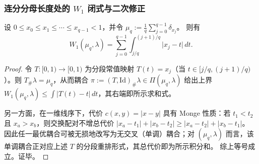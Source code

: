 \subsubsection{连分分母长度处的 \texorpdfstring{$W_1$}{W1} 闭式与二次修正}\label{subsec:kronecker-w1-denominator}

\begin{lemma}[一维单调耦合的分位公式]\label{lem:w1-quantile-formula-empirical-uniform}
设 \(0\le x_0\le x_1\le\cdots\le x_{q-1}<1\)，并令
\(
\mu_q:=\frac1q\sum_{j=0}^{q-1}\delta_{x_j}
\)。
则有
\[
W_1(\mu_q,\lambda)=\sum_{j=0}^{q-1}\int_{j/q}^{(j+1)/q}\bigl|x_j-t\bigr|\,dt.
\]
\end{lemma}
\begin{proof}
令 \(T:[0,1)\to[0,1)\) 为分段常值映射 \(T(t)=x_j\)（当 \(t\in[j/q,(j+1)/q)\)）。则 \(T_\#\lambda=\mu_q\)，从而耦合 \(\pi:=(T,\mathrm{Id})_\#\lambda\in\Pi(\mu_q,\lambda)\) 给出上界
\(
W_1(\mu_q,\lambda)\le \int|T(t)-t|\,dt
\)，其右端即所示求和式。
\par
另一方面，在一维线序下，代价 \(c(x,y)=|x-y|\) 具有 Monge 性质：若 \(t_1<t_2\) 且 \(x_a>x_b\)，则交换配对不增总代价
\(
|x_a-t_1|+|x_b-t_2|\ge |x_a-t_2|+|x_b-t_1|
\)。
因此任一最优耦合可被无损地改写为无交叉（单调）耦合；对 \((\mu_q,\lambda)\) 而言，该单调耦合正对应上述 \(T\) 的分段重排形式，其总代价即为所示积分和。
综上等号成立。证毕。
\end{proof}

